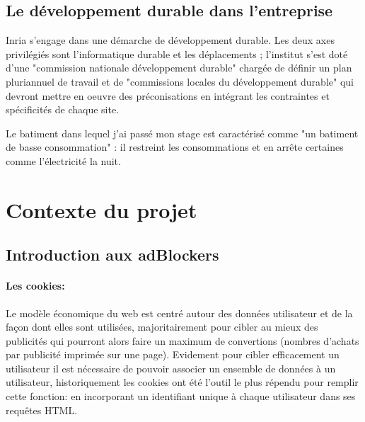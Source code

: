 \documentclass[oneside,a4paper,12pt]{article}
\begin{document}
\subsection{Le développement durable dans l'entreprise}
Inria s’engage dans une démarche de développement durable. Les deux axes privilégiés sont l'informatique durable et les déplacements ; l'institut s'est doté d'une "commission nationale développement durable" chargée de définir un plan pluriannuel de travail et de "commissions locales du développement durable" qui devront mettre en oeuvre des préconisations en intégrant les contraintes et spécificités de chaque site.

Le batiment dans lequel j'ai passé mon stage est caractérisé comme "un batiment de basse consommation" : il restreint les consommations et en arrête certaines comme l'électricité la nuit.



\newpage

\section{Contexte du projet}
\subsection{Introduction aux adBlockers}\label{Intro:adblock}

\paragraph*{Les cookies:}

Le modèle économique du web est centré autour des données utilisateur et de la façon dont elles sont utilisées, majoritairement pour cibler au mieux des publicités qui pourront alors faire un maximum de convertions (nombres d'achats par publicité imprimée sur une page). Evidement pour cibler efficacement un utilisateur il est nécessaire de pouvoir associer un ensemble de données à un utilisateur, historiquement les cookies ont été l'outil le plus répendu pour remplir cette fonction: en incorporant un identifiant unique à chaque utilisateur dans ses requêtes HTML.\\
\end{document}
